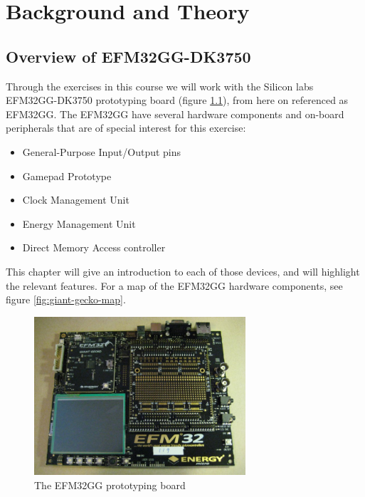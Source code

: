 \chapter{Background and Theory}


\section{Overview of EFM32GG-DK3750}
Through the exercises in this course we will work with the Silicon labs EFM32GG-DK3750 prototyping board (figure \ref{fig:efm-board}), from here on referenced as EFM32GG. The EFM32GG have several hardware components and on-board peripherals that are of special interest for this exercise:
\begin{itemize}
	\item General-Purpose Input/Output pins
	\item Gamepad Prototype
	\item Clock Management Unit
	\item Energy Management Unit
	\item Direct Memory Access controller
\end{itemize}
This chapter will give an introduction to each of those devices, and will highlight the relevant features. For a map of the EFM32GG hardware components, see figure \ref{fig:giant-gecko-map}.

\begin{figure}[ht]
  \centering
  \includegraphics[width=0.7\textwidth]{images/efm_board.jpg}
  \caption{The EFM32GG prototyping board}\label{fig:efm-board}
\end{figure}


